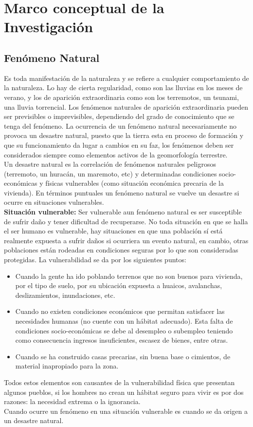 \documentclass[11pt,openany]{book}
\newcounter{ns}
\begin{document}
	\section{Marco conceptual de la Investigación}

	\subsection{Fenómeno Natural}
	Es toda manifestación de la naturaleza \cite{romero1993} y se refiere a cualquier comportamiento de la naturaleza. Lo hay de cierta regularidad, como son las lluvias en los meses de verano, y los de aparición extraordinaria como son los terremotos, un tsunami, una lluvia torrencial. Los fenómenos naturales de aparición extraordinaria pueden ser previsibles o imprevisibles, dependiendo del grado de conocimiento que se tenga del fenómeno. La ocurrencia de un fenómeno natural necesariamente no provoca un desastre natural, puesto que la tierra esta en proceso de formación y que su funcionamiento da lugar a cambios en su faz, los fenómenos deben ser considerados siempre como elementos activos de la geomorfología terrestre.\\
	Un desastre natural es la correlación de fenómenos naturales peligrosos (terremoto, un huracán, un maremoto, etc) y determinadas condiciones socio-económicas y físicas vulnerables (como situación económica precaria de la vivienda). En términos puntuales un fenómeno natural se vuelve un desastre si ocurre en situaciones vulnerables.\\
	\textbf{Situación vulnerable: }Ser vulnerable aun fenómeno natural es ser susceptible de sufrir daño y tener dificultad de recuperarse. No toda situación en que se halla el ser humano es vulnerable, hay situaciones en que una población sí está realmente expuesta a sufrir daños si ocurriera un evento natural, en cambio, otras poblaciones están rodeadas en condiciones seguras por lo que son consideradas 	protegidas. La vulnerabilidad se da por los siguientes puntos:
	\begin{itemize}
		\item Cuando la gente ha ido poblando terrenos que no son buenos para vivienda, por el tipo de suelo, por su ubicación expuesta a huaicos, avalanchas, deslizamientos, inundaciones, etc.
		\item Cuando no existen condiciones económicos que permitan satisfacer las necesidades humanas (no cuente con un hábitat adecuado). Esta falta de condiciones socio-económicas se debe al desempleo o subempleo teniendo como consecuencia ingresos insuficientes, escasez de bienes, entre otras.
		\item Cuando se ha construido casas precarias, sin buena base o cimientos, de material inapropiado para la zona.
	\end{itemize}
	Todos estos elementos son causantes de la vulnerabilidad física que presentan algunos pueblos, si los hombres no crean un hábitat seguro para vivir es por dos razones: la necesidad extrema o la ignorancia.\\
	Cuando ocurre un fenómeno en una situación vulnerable es cuando se da origen a un desastre natural.
\end{document}
